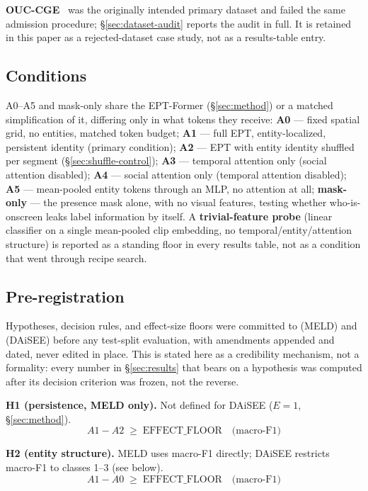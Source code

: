 \textbf{OUC-CGE}~\cite{lu2025ouccge} was the originally intended primary
dataset and failed the same admission procedure; \S\ref{sec:dataset-audit}
reports the audit in full. It is retained in this paper as a rejected-dataset
case study, not as a results-table entry.

\subsection{Conditions}
A0--A5 and mask-only share the EPT-Former (\S\ref{sec:method}) or a matched
simplification of it, differing only in what tokens they receive: \textbf{A0}
--- fixed spatial grid, no entities, matched token budget; \textbf{A1} ---
full EPT, entity-localized, persistent identity (primary condition);
\textbf{A2} --- EPT with entity identity shuffled per segment
(\S\ref{sec:shuffle-control}); \textbf{A3} --- temporal attention only
(social attention disabled); \textbf{A4} --- social attention only (temporal
attention disabled); \textbf{A5} --- mean-pooled entity tokens through an
MLP, no attention at all; \textbf{mask-only} --- the presence mask alone,
with no visual features, testing whether who-is-onscreen leaks label
information by itself. A \textbf{trivial-feature probe} (linear classifier
on a single mean-pooled clip embedding, no temporal/entity/attention
structure) is reported as a standing floor in every results table, not as a
condition that went through recipe search.

\subsection{Pre-registration}
Hypotheses, decision rules, and effect-size floors were committed to
\texttt{} (MELD) and
\texttt{} (DAiSEE) before any
test-split evaluation, with amendments appended and dated, never edited in
place. This is stated here as a credibility mechanism, not a formality:
every number in \S\ref{sec:results} that bears on a hypothesis was computed
after its decision criterion was frozen, not the reverse.

\textbf{H1 (persistence, MELD only).} Not defined for DAiSEE ($E{=}1$,
\S\ref{sec:method}).
\[
A1 - A2 \;\geq\; \text{EFFECT\_FLOOR} \quad \text{(macro-F1)}
\]

\textbf{H2 (entity structure).} MELD uses macro-F1 directly; DAiSEE
restricts macro-F1 to classes 1--3 (see below).
\[
A1 - A0 \;\geq\; \text{EFFECT\_FLOOR} \quad \text{(macro-F1)}
\]

